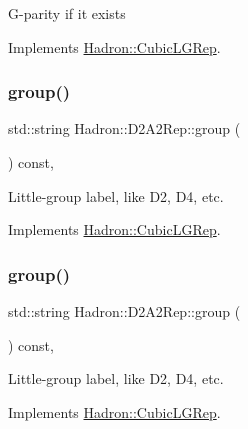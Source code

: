 G-\/parity if it exists 

Implements \mbox{\hyperlink{structHadron_1_1CubicLGRep_ace26f7b2d55e3a668a14cb9026da5231}{Hadron\+::\+Cubic\+L\+G\+Rep}}.

\mbox{\label{structHadron_1_1D2A2Rep_a8e9ca89445c95fe1a83b73d4eeddf68b}} 
\subsubsection{\texorpdfstring{group()}{group()}\hspace{0.1cm}{\footnotesize\ttfamily [1/3]}}
{\footnotesize\ttfamily std\+::string Hadron\+::\+D2\+A2\+Rep\+::group (\begin{DoxyParamCaption}{ }\end{DoxyParamCaption}) const\hspace{0.3cm}{\ttfamily [inline]}, {\ttfamily [virtual]}}

Little-\/group label, like D2, D4, etc. 

Implements \mbox{\hyperlink{structHadron_1_1CubicLGRep_a9bdb14b519a611d21379ed96a3a9eb41}{Hadron\+::\+Cubic\+L\+G\+Rep}}.

\mbox{\label{structHadron_1_1D2A2Rep_a8e9ca89445c95fe1a83b73d4eeddf68b}} 
\subsubsection{\texorpdfstring{group()}{group()}\hspace{0.1cm}{\footnotesize\ttfamily [2/3]}}
{\footnotesize\ttfamily std\+::string Hadron\+::\+D2\+A2\+Rep\+::group (\begin{DoxyParamCaption}{ }\end{DoxyParamCaption}) const\hspace{0.3cm}{\ttfamily [inline]}, {\ttfamily [virtual]}}

Little-\/group label, like D2, D4, etc. 

Implements \mbox{\hyperlink{structHadron_1_1CubicLGRep_a9bdb14b519a611d21379ed96a3a9eb41}{Hadron\+::\+Cubic\+L\+G\+Rep}}.

\mbox{\label{structHadron_1_1D2A2Rep_a8e9ca89445c95fe1a83b73d4eeddf68b}} 
